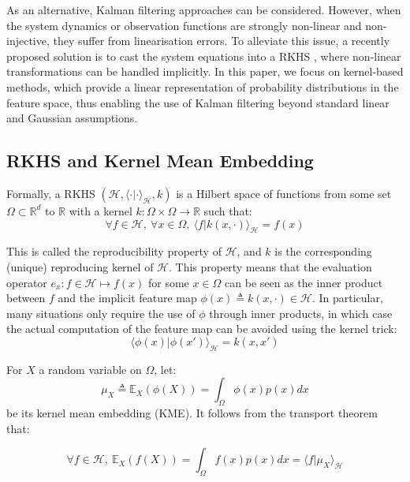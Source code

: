 \documentclass[conference]{IEEEtran}
\begin{document}
As an alternative, Kalman filtering approaches can be considered. However, when the system dynamics or observation functions are strongly non-linear and non-injective, they suffer from linearisation errors. To alleviate this issue, a recently proposed solution is to cast the system equations into a RKHS \cite{bib:RKHS}, where non-linear transformations can be handled implicitly. In this paper, we focus on kernel-based methods, which provide a linear representation of probability distributions in the feature space, thus enabling the use of Kalman filtering beyond standard linear and Gaussian assumptions.

\subsection{RKHS and Kernel Mean Embedding}

Formally, a RKHS $(\mathcal{H},\langle\cdot|\cdot\rangle_{\mathcal{H}},k)$ is a Hilbert space of functions from some set $\Omega\subset\mathbb{R}^d$ to $\mathbb{R}$ with a kernel $k:\Omega\times\Omega\rightarrow\mathbb{R}$ such that:
\begin{equation}
\forall f\in\mathcal{H},\:\forall x\in\Omega,\:\langle f|k(x,\cdot)\rangle_{\mathcal{H}}=f(x)\label{eq:reproducing property}
\end{equation}

This is called the reproducibility property of $\mathcal{H}$, and $k$ is the corresponding (unique) reproducing kernel of $\mathcal{H}$. This property means that the evaluation operator $e_x:f\in\mathcal{H}\mapsto f(x)$ for some $x\in\Omega$ can be seen as the inner product between $f$ and the implicit feature map $\phi(x)\triangleq k(x,\cdot)\in\mathcal{H}$. In particular, many situations only require the use of $\phi$ through inner products, in which case the actual computation of the feature map can be avoided using the kernel trick:
\begin{equation}
\langle\phi(x)|\phi(x')\rangle_{\mathcal{H}}=k(x,x')
\end{equation}

For $X$ a random variable on $\Omega$, let:
\begin{equation}
\mu_X\triangleq\mathbb{E}_X(\phi(X))=\int_{\Omega}{\phi(x)p(x)dx}\label{eq:KME}
\end{equation}
be its kernel mean embedding (KME). It follows from the transport theorem that:

\begin{equation}
\forall f\in\mathcal{H},\:\mathbb{E}_X(f(X))=\int_{\Omega}{f(x)p(x)dx}=\langle f|\mu_X\rangle_{\mathcal{H}}\label{eq:KME expectation}
\end{equation}
\end{document}
